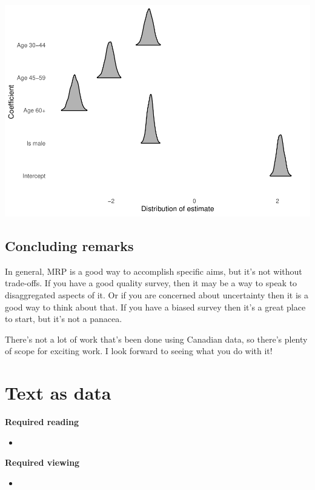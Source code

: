 \documentclass[
]{book}
\begin{document}
\includegraphics{telling_stories_with_data_files/figure-latex/unnamed-chunk-397-1.pdf}

\hypertarget{concluding-remarks}{%
\section{Concluding remarks}\label{concluding-remarks}}

In general, MRP is a good way to accomplish specific aims, but it's not without trade-offs. If you have a good quality survey, then it may be a way to speak to disaggregated aspects of it. Or if you are concerned about uncertainty then it is a good way to think about that. If you have a biased survey then it's a great place to start, but it's not a panacea.

There's not a lot of work that's been done using Canadian data, so there's plenty of scope for exciting work. I look forward to seeing what you do with it!

\hypertarget{text-as-data}{%
\chapter{Text as data}\label{text-as-data}}

\textbf{Required reading}

\begin{itemize}
\item
\end{itemize}

\textbf{Required viewing}

\begin{itemize}
\item
\end{itemize}
\end{document}
